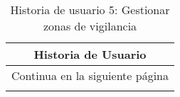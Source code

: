 

\begin{longtable}{|p{6.7cm}|p{6.7cm}|}
    \caption{Historia de usuario 5: Gestionar zonas de vigilancia} \label{tab:historia-5}
    \\
    \hline
    \multicolumn{2}{|c|}{\textbf{Historia de Usuario}}                                                                                                           \\
    \hline

    \endfirsthead

    \hline
    \endhead

    \hline
    \multicolumn{2}{|c|}{{Continua en la siguiente página}}                                                                                                      \\
    \hline
    \endfoot

    \hline
    \endlastfoot


\end{longtable}
